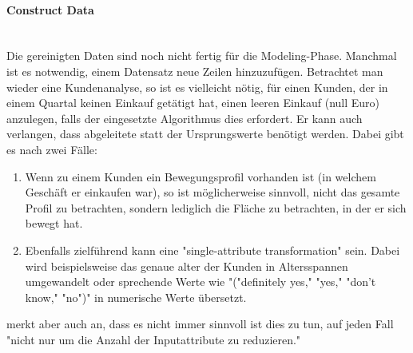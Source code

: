 \paragraph{Construct Data}\mbox{} \\
Die gereinigten Daten sind noch nicht fertig für die Modeling-Phase. Manchmal ist es notwendig, einem Datensatz neue Zeilen hinzuzufügen. Betrachtet man wieder eine Kundenanalyse, so ist es vielleicht nötig, für einen Kunden, der in einem Quartal keinen Einkauf getätigt hat, einen leeren Einkauf (null Euro) anzulegen, falls der eingesetzte Algorithmus dies erfordert.\citep[S.~22]{chapman_crisp-dm_2000} Er kann auch verlangen, dass abgeleitete  statt der Ursprungswerte benötigt werden. Dabei gibt es nach \citep[S.~16]{shearer_crisp-dm_2000} zwei Fälle:
\begin{enumerate}
\item Wenn zu einem Kunden ein Bewegungsprofil vorhanden ist (in welchem Geschäft er einkaufen war), so ist möglicherweise sinnvoll, nicht das gesamte Profil zu betrachten, sondern lediglich die Fläche zu betrachten, in der er sich bewegt hat.
\item Ebenfalls zielführend kann eine "single-attribute transformation" sein. Dabei wird beispielsweise das genaue alter der Kunden in Altersspannen umgewandelt oder sprechende Werte wie "("definitely yes," "yes," "don't know," "no")" in numerische Werte übersetzt.
\end{enumerate}
\citep[S.~16; eigene Übersetzung]{shearer_crisp-dm_2000} merkt aber auch an, dass es nicht immer sinnvoll ist dies zu tun, auf jeden Fall "nicht nur um die Anzahl der Inputattribute zu reduzieren."

